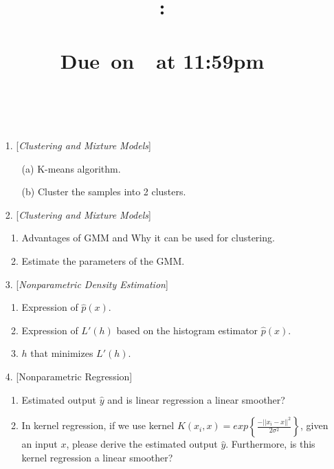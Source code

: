 \documentclass{article}
\title{
    \vspace{2in}
    \textmd{\textbf{\hmwkClass:\\ \hmwkTitle}}\\
    \normalsize\vspace{0.1in}\small{Due\ on\ \hmwkDueDate\ at 11:59pm}\\
    \vspace{0.1in}\large{\textit{\hmwkClassInstructor}}
    \vspace{3in}
}
\author{\textbf{\hmwkAuthorName}\\ \hmwkAuthorID}
\date{}
\begin{document}
\maketitle
\pagebreak

\begin{enumerate}
    \item [1.] [\textit{Clustering and Mixture Models}]
    \begin{enumerate}
        \item [(a)] K-means algorithm.
        \item [(b)] Cluster the samples into 2 clusters.
    \end{enumerate}
    \item [2.] [\textit{Clustering and Mixture Models}]
    \begin{enumerate}
        \item Advantages of GMM and Why it can be used for clustering.
        \item Estimate the parameters of the GMM.
    \end{enumerate}
    \item [3.] [\textit{Nonparametric Density Estimation}]
    \begin{enumerate}
        \item Expression of $\hat{p}(x)$.
        \item Expression of $L'(h)$ based on the histogram estimator $\hat{p}(x)$.
        \item $h$ that minimizes $L'(h)$.
    \end{enumerate}
    \item [4.] [Nonparametric Regression]
    \begin{enumerate}
        \item Estimated output $\hat{y}$ and is linear regression a linear smoother?
        \item In kernel regression, if we use kernel $K(x_i,x)=exp\left\{\frac{-||x_i-x||^2}{2\sigma^2}\right\}$, given an input $x$, please derive the estimated output $\hat{y}$. Furthermore, is this kernel regression a linear smoother?
    \end{enumerate}
\end{enumerate}
\end{document}

